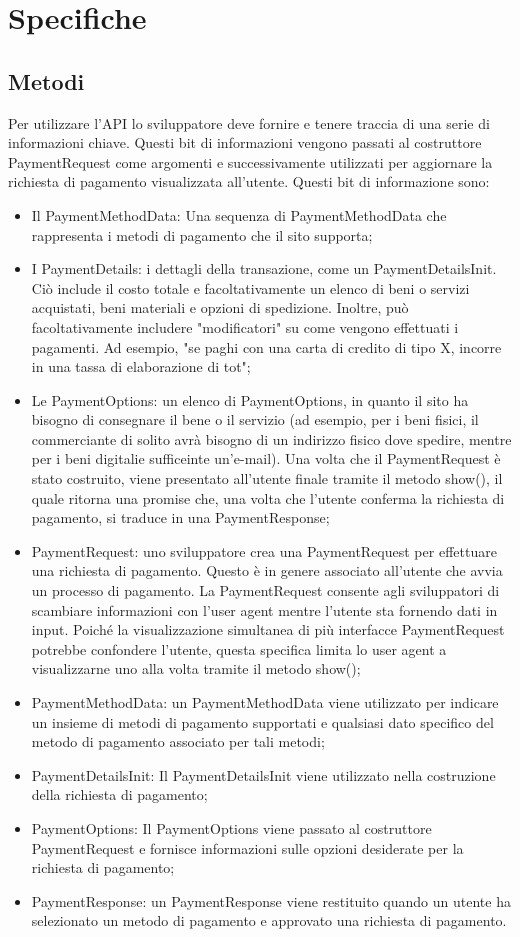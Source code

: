 \documentclass[italian]{article}
\begin{document}
	\section{Specifiche}
	\subsection{Metodi}
	Per utilizzare l'API lo sviluppatore deve fornire e tenere traccia di una serie di informazioni chiave. Questi bit di informazioni vengono passati al costruttore PaymentRequest come argomenti e successivamente utilizzati per aggiornare la richiesta di pagamento visualizzata all'utente. Questi bit di informazione sono:
	\begin{itemize}
	\item Il PaymentMethodData: Una sequenza di PaymentMethodData che rappresenta i metodi di pagamento che il sito supporta;
	\item I PaymentDetails: i dettagli della transazione, come un PaymentDetailsInit. Ciò include il costo totale e facoltativamente un elenco di beni o servizi acquistati, beni materiali e opzioni di spedizione. Inoltre, può facoltativamente includere "modificatori" su come vengono effettuati i pagamenti. Ad esempio, "se paghi con una carta di credito di tipo X, incorre in una tassa di elaborazione di tot";
	\item Le PaymentOptions: un elenco di PaymentOptions, in quanto il sito ha bisogno di consegnare il bene o il servizio (ad esempio, per i beni fisici, il commerciante di solito avrà bisogno di un indirizzo fisico dove spedire, mentre per i beni digitalie sufficeinte un'e-mail). Una volta che il PaymentRequest è stato costruito, viene presentato all'utente finale tramite il metodo show(), il quale ritorna una promise che, una volta che l'utente conferma la richiesta di pagamento, si traduce in una PaymentResponse;
	\item PaymentRequest: uno sviluppatore crea una PaymentRequest per effettuare una richiesta di pagamento. Questo è in genere associato all'utente che avvia un processo di pagamento. La PaymentRequest consente agli sviluppatori di scambiare informazioni con l'user agent mentre l'utente sta fornendo dati in input. Poiché la visualizzazione simultanea di più interfacce PaymentRequest potrebbe confondere l'utente, questa specifica limita lo user agent a visualizzarne uno alla volta tramite il metodo show();
	\item PaymentMethodData: un PaymentMethodData viene utilizzato per indicare un insieme di metodi di pagamento supportati e qualsiasi dato specifico del metodo di pagamento associato per tali metodi;
	\item PaymentDetailsInit: Il PaymentDetailsInit viene utilizzato nella costruzione della richiesta di pagamento;
	\item PaymentOptions: Il PaymentOptions viene passato al costruttore PaymentRequest e fornisce informazioni sulle opzioni desiderate per la richiesta di pagamento;
	\item PaymentResponse: un PaymentResponse viene restituito quando un utente ha selezionato un metodo di pagamento e approvato una richiesta di pagamento.
	\end{itemize}
\end{document}
